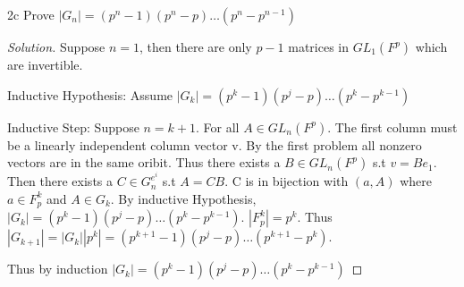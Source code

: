 \documentclass{article}
\newenvironment{solution}
{\renewcommand\qedsymbol{$\blacksquare$}\begin{proof}[Solution]}
{\end{proof}}
\begin{document}
\begin{claim}{2c}
    Prove $|G_n| = (p^n -1)(p^n - p) \ldots (p^n - p^{n-1})$
\end{claim}
\begin{solution}
    Suppose $n = 1$, then there are only $p - 1$ matrices in $GL_1(F^p)$ which are invertible.

    Inductive Hypothesis: Assume $|G_k| = (p^k -1)(p^j - p) \ldots (p^k - p^{k-1})$

    Inductive Step: Suppose $n = k + 1$. For all $A \in GL_n(F^p)$. The first column must be a linearly independent column vector v. By the first problem all nonzero vectors are in the same oribit. Thus there exists a $B \in GL_n(F^p)$ s.t $v = Be_1$. Then there exists a $C \in G_n^{e^i}$ s.t $A = CB$. C is in bijection with $(a, A)$ where $a \in F_p^{k}$ and $A \in G_{k}$. By inductive Hypothesis, $|G_k| = (p^k -1)(p^j - p) \ldots (p^k - p^{k-1})$. $|F_p^{k}| = p^k$. Thus $|G_{k + 1}| = |G_{k}||p^k| = (p^{k + 1} -1)(p^j - p) \ldots (p^{k + 1} - p^{k})$. 
    
    Thus by induction $|G_k| = (p^k -1)(p^j - p) \ldots (p^k - p^{k-1})$
\end{solution}
\end{document}
